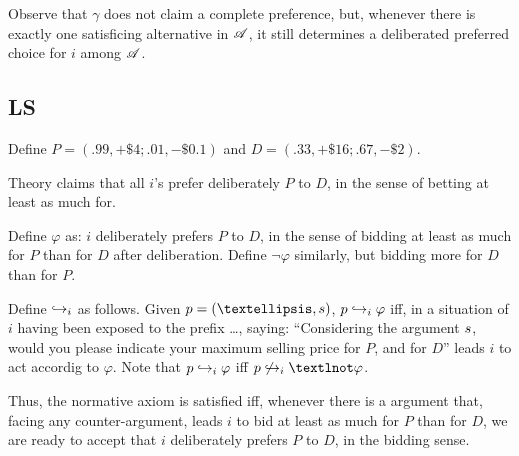 \documentclass[version=last, pagesize, twoside=off, bibliography=totoc, DIV=calc, fontsize=12pt, a4paper, french, english]{scrartcl}
\renewcommand{\phi}{\varphi}%
\begin{document}
Observe that $\gamma$ does not claim a complete preference, but, whenever there is exactly one satisficing alternative in $\mathscr{A}$, it still determines a deliberated preferred choice for $i$ among $\mathscr{A}$.

\subsection{LS}
%
%
%
%
%
%
Define $P = (.99, +\$4; .01, −\$0.1)$ and $D = (.33, +\$16; .67, −\$2)$.

Theory claims that all $i$’s prefer deliberately $P$ to $D$, in the sense of betting at least as much for.

Define $\phi$ as: $i$ deliberately prefers $P$ to $D$, in the sense of bidding at least as much for $P$ than for $D$ after deliberation. Define $¬\phi$ similarly, but bidding more for $D$ than for $P$. 

Define $\hookrightarrow_i$ as follows. Given $\hist = (…, \ar)$, $\hist \ileadstost \phi$ iff, in a situation of $i$ having been exposed to the prefix …, saying: “Considering the argument $\ar$, would you please indicate your maximum selling price for $P$, and for $D$” leads $i$ to act accordig to $\phi$. Note that $\hist \ileadstost \phi$ iff $\hist \nileadstost ¬\phi$.

Thus, the normative axiom is satisfied iff, whenever there is a argument that, facing any counter-argument, leads $i$ to bid at least as much for $P$ than for $D$, we are ready to accept that $i$ deliberately prefers $P$ to $D$, in the bidding sense.
\end{document}
